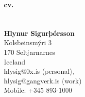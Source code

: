\documentclass[margin]{res}
\begin{document}
    \begin{figure}
        \hspace{-3.4cm}
        \begin{minipage}[b]{0.70\linewidth}
            {\Huge\bf cv.\\\\\\
            \large\bf Hlynur Sigurþórsson}\\
            Kolsbeinsmýri 3\\
            170 Seltjarnarnes\\
            Iceland\\
            hlysig@0x.is (personal),\\hlysig@gangverk.is (work)\\
            Mobile: +345 893-1000\\
        \end{minipage}
    \end{figure}
    \begin{resume}
        
        
        
        
        
        
        
    \end{resume}
    
\end{document}
